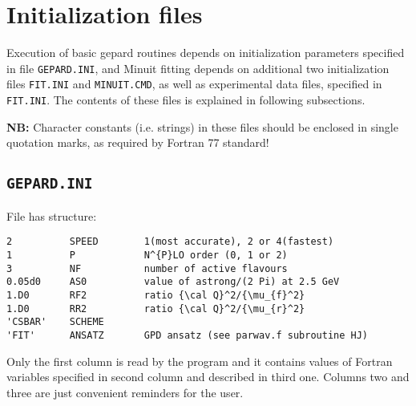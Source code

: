 \documentclass[12pt]{article}
\begin{document}
\section{Initialization files}

Execution of basic gepard routines depends on initialization parameters specified in
file \texttt{GEPARD.INI}, and Minuit fitting depends on additional two initialization files
\texttt{FIT.INI} and \texttt{MINUIT.CMD}, as well as experimental data files, specified
in  \texttt{FIT.INI}. The contents of these files is explained in following subsections.

\textbf{NB:} Character constants (i.e. strings) in these files should be enclosed in
single quotation marks, as required by Fortran 77 standard!

\subsection{\texttt{GEPARD.INI}}

File has structure:

\begin{verbatim}
2          SPEED        1(most accurate), 2 or 4(fastest)
1          P            N^{P}LO order (0, 1 or 2)
3          NF           number of active flavours
0.05d0     AS0          value of astrong/(2 Pi) at 2.5 GeV
1.D0       RF2          ratio {\cal Q}^2/{\mu_{f}^2}
1.D0       RR2          ratio {\cal Q}^2/{\mu_{r}^2}
'CSBAR'    SCHEME       
'FIT'      ANSATZ       GPD ansatz (see parwav.f subroutine HJ)
\end{verbatim}

Only the first column is read by the program and it contains
values of Fortran variables specified in second column and described
in third one. Columns two and three are just convenient reminders for the user. 
\end{document}

